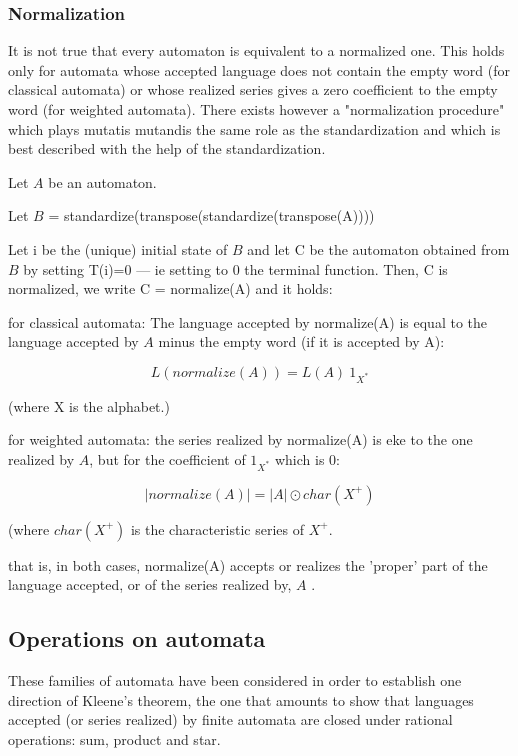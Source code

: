 \documentclass[a4paper]{report}
\begin{document}
\subsubsection{Normalization}

It is not true that every automaton is equivalent to a normalized one.
This holds only for automata whose accepted language does not contain
the empty word (for classical automata) or whose realized series gives
a zero coefficient to the empty word (for weighted automata). There
exists however a "normalization procedure" which plays mutatis
mutandis the same role as the standardization and which is best
described with the help of the standardization.

Let $A$ be an automaton.

Let $B$ = standardize(transpose(standardize(transpose(A))))

Let i be the (unique) initial state of $B$ and let C be the automaton
obtained from $B$ by setting T(i)=0 --- ie setting to 0 the terminal
function. Then, C is normalized, we write C = normalize(A) and it
holds:

for classical automata: The language accepted by normalize(A) is equal
to the language accepted by $A$ minus the empty word (if it is accepted
by A):

\begin{displaymath}
  L(normalize(A))  =  L(A) \ 1_{X^*}
\end{displaymath}

\noindent
(where  X  is the alphabet.)

for weighted automata: the series realized by normalize(A) is eke to
the one realized by $A$, but for the coefficient of $1_{X^*}$ which is 0:

\begin{displaymath}
  |normalize(A)|  =  |A| \odot  char(X^+)
\end{displaymath}

\noindent
(where  $char(X^+)$  is the characteristic series of  $X^+$.

that is, in both cases, normalize(A) accepts or realizes the 'proper'
part of the language accepted, or of the series realized by, $A$ .

\subsection{Operations on automata}

These families of automata have been considered in order to establish
one direction of Kleene's theorem, the one that amounts to show that
languages accepted (or series realized) by finite automata are closed
under rational operations: sum, product and star.
\end{document}
